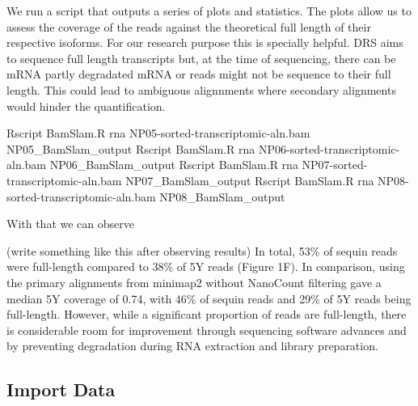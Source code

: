\documentclass[
  letterpaper,
  DIV=11,
  numbers=noendperiod]{scrartcl}
\newenvironment{Shaded}{\begin{snugshade}}{\end{snugshade}}
\newcommand{\NormalTok}[1]{\textcolor[rgb]{0.00,0.23,0.31}{#1}}
\newcommand{\SpecialCharTok}[1]{\textcolor[rgb]{0.37,0.37,0.37}{#1}}
\begin{document}
We run a script that outputs a series of plots and statistics. The plots
allow us to assess the coverage of the reads against the theoretical
full length of their respective isoforms. For our research purpose this
is specially helpful. DRS aims to sequence full length transcripts but,
at the time of sequencing, there can be mRNA partly degradated mRNA or
reads might not be sequence to their full length. This could lead to
ambiguous alignnments where secondary alignments would hinder the
quantification.

\begin{Shaded}
\begin{Highlighting}[]
\NormalTok{Rscript BamSlam.R rna NP05}\SpecialCharTok{{-}}\NormalTok{sorted}\SpecialCharTok{{-}}\NormalTok{transcriptomic}\SpecialCharTok{{-}}\NormalTok{aln.bam NP05\_BamSlam\_output}
\NormalTok{Rscript BamSlam.R rna NP06}\SpecialCharTok{{-}}\NormalTok{sorted}\SpecialCharTok{{-}}\NormalTok{transcriptomic}\SpecialCharTok{{-}}\NormalTok{aln.bam NP06\_BamSlam\_output}
\NormalTok{Rscript BamSlam.R rna NP07}\SpecialCharTok{{-}}\NormalTok{sorted}\SpecialCharTok{{-}}\NormalTok{transcriptomic}\SpecialCharTok{{-}}\NormalTok{aln.bam NP07\_BamSlam\_output}
\NormalTok{Rscript BamSlam.R rna NP08}\SpecialCharTok{{-}}\NormalTok{sorted}\SpecialCharTok{{-}}\NormalTok{transcriptomic}\SpecialCharTok{{-}}\NormalTok{aln.bam NP08\_BamSlam\_output}
\end{Highlighting}
\end{Shaded}

With that we can observe

(write something like this after observing results) In total, 53\% of
sequin reads were full-length compared to 38\% of 5Y reads (Figure 1F).
In comparison, using the primary alignments from minimap2 without
NanoCount filtering gave a median 5Y coverage of 0.74, with 46\% of
sequin reads and 29\% of 5Y reads being full-length. However, while a
significant proportion of reads are full-length, there is considerable
room for improvement through sequencing software advances and by
preventing degradation during RNA extraction and library preparation.

\hypertarget{import-data}{%
\subsection{Import Data}\label{import-data}}
\end{document}
